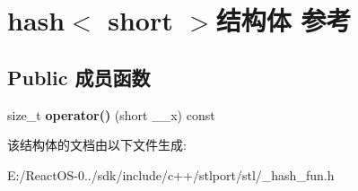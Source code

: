 \hypertarget{structhash_3_01short_01_4}{}\section{hash$<$ short $>$结构体 参考}
\label{structhash_3_01short_01_4}
\subsection*{Public 成员函数}
\begin{DoxyCompactItemize}
\item 
\mbox{\label{structhash_3_01short_01_4_abf6d2f9903a4a5afd9e0819fdf552a15}} 
size\+\_\+t {\bfseries operator()} (short \+\_\+\+\_\+x) const
\end{DoxyCompactItemize}


该结构体的文档由以下文件生成\+:\begin{DoxyCompactItemize}
\item 
E\+:/\+React\+O\+S-\/0../sdk/include/c++/stlport/stl/\+\_\+hash\+\_\+fun.\+h\end{DoxyCompactItemize}
